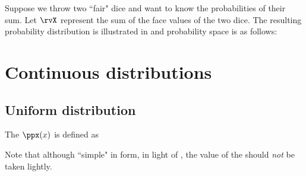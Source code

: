 \begin{example}
\label{ex:two_dice}
Suppose we throw two ``fair" dice and want to know the probabilities of their sum.
Let $\rvX$ represent the sum  of the face values of the two dice.
The resulting probability distribution is illustrated in 
and probability space is as follows:


\end{example}

\section{Continuous distributions}
\subsection{Uniform distribution}
\begin{definition}
\label{def:uniform}
The  $\ppx(x)$ is defined as
\end{definition}

Note that although ``simple" in form, in light of , the
value of the  should \emph{not} be taken lightly.


